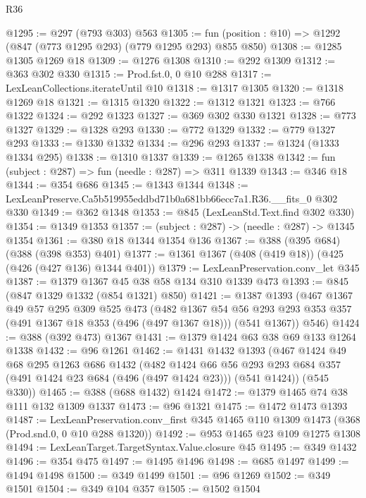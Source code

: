 \begin{lexlean}{R36}
\begin{coremodule}
@1295 := @297 (@793 @303) @563
@1305 := fun (position : @10) => @1292 (@847 (@773 @1295 @293) (@779 @1295 @293) @855 @850)
@1308 := @1285 @1305 @1269 @18
@1309 := @1276 @1308
@1310 := @292 @1309
@1312 := @363 @302 @330
@1315 := Prod.fst.{0, 0} @10 @288
@1317 := LexLeanCollections.iterateUntil @10
@1318 := @1317 @1305
@1320 := @1318 @1269 @18
@1321 := @1315 @1320
@1322 := @1312 @1321
@1323 := @766 @1322
@1324 := @292 @1323
@1327 := @369 @302 @330 @1321
@1328 := @773 @1327
@1329 := @1328 @293
@1330 := @772 @1329
@1332 := @779 @1327 @293
@1333 := @1330 @1332
@1334 := @296 @293
@1337 := @1324 (@1333 @1334 @295)
@1338 := @1310 @1337
@1339 := @1265 @1338
@1342 := fun (subject : @287) => fun (needle : @287) => @311 @1339
@1343 := @346 @18
@1344 := @354 @686
@1345 := @1343 @1344
@1348 := LexLeanPreserve.Ca5b519955eddbd71b0a681bb66ecc7a1.R36.__fits_0 @302 @330
@1349 := @362 @1348
@1353 := @845 (LexLeanStd.Text.find @302 @330)
@1354 := @1349 @1353
@1357 := (subject : @287) -> (needle : @287) -> @1345 @1354
@1361 := @380 @18 @1344 @1354 @136
@1367 := @388 (@395 @684) (@388 (@398 @353) @401)
@1377 := @1361 @1367 (@408 (@419 @18)) (@425 (@426 (@427 @136) @1344 @401))
@1379 := LexLeanPreservation.conv_let @345
@1387 := @1379 @1367 @45 @38 @58 @134 @310 @1339 @473
@1393 := @845 (@847 @1329 @1332 (@854 @1321) @850)
@1421 := @1387
    @1393
    (@467
      @1367
      @49
      @57
      @295
      @309
      @525
      @473
      (@482
        @1367
        @54
        @56
        @293
        @293
        @353
        @357
        (@491 @1367 @18 @353 (@496 (@497 @1367 @18)))
        (@541 @1367))
      @546)
@1424 := @388 (@392 @473) @1367
@1431 := @1379 @1424 @63 @38 @69 @133 @1264 @1338
@1432 := @96 @1261
@1462 := @1431
    @1432
    @1393
    (@467
      @1424
      @49
      @68
      @295
      @1263
      @686
      @1432
      (@482
        @1424
        @66
        @56
        @293
        @293
        @684
        @357
        (@491 @1424 @23 @684 (@496 (@497 @1424 @23)))
        (@541 @1424))
      (@545 @330))
@1465 := @388 (@688 @1432) @1424
@1472 := @1379 @1465 @74 @38 @111 @132 @1309 @1337
@1473 := @96 @1321
@1475 := @1472 @1473 @1393
@1487 := LexLeanPreservation.conv_first
    @345
    @1465
    @110
    @1309
    @1473
    (@368 (Prod.snd.{0, 0} @10 @288 @1320))
@1492 := @953 @1465 @23 @109 @1275 @1308
@1494 := LexLeanTarget.TargetSyntax.Value.closure @45
@1495 := @349 @1432
@1496 := @354 @475
@1497 := @1495 @1496
@1498 := @685 @1497
@1499 := @1494 @1498
@1500 := @349 @1499
@1501 := @96 @1269
@1502 := @349 @1501
@1504 := @349 @104 @357
@1505 := @1502 @1504

\end{coremodule}
\end{lexlean}
